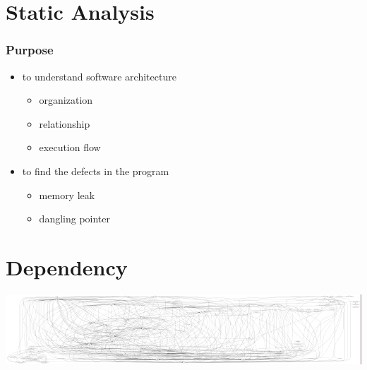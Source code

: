 
\section{Static Analysis}
\begin{frame}[t]
	\frametitle{Purpose}
	\begin{itemize}
		\item<+-|alert@+> to understand software architecture
		\begin{itemize}
			\item<+-|alert@+> organization
			\item<+-|alert@+> relationship
			\item<+-|alert@+> execution flow
		\end{itemize}
		\item<+-|alert@+> to find the defects in the program
		\begin{itemize}
			\item<+-|alert@+> memory leak
			\item<+-|alert@+> dangling pointer
		\end{itemize}
	\end{itemize}
\end{frame}



\section{Dependency}

\begin{frame}[plain]
	\begin{center}
		\includegraphics[scale=0.4]{gcin-2-6-5.png}
	\end{center}
\end{frame}

